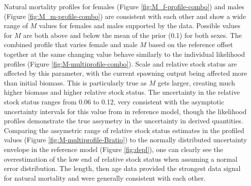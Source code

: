 \documentclass[11pt,
  english,
  a4paper,
]{article}
\begin{document}
Natural mortality profiles for females (Figure \ref{fig:M_f-profile-combo}) and males (Figure \ref{fig:M_m-profile-combo}) are consistent with each other and show a wide range of {\(M\)\leavevmode\tagmcend\tagstructend} values for females and males supported by the data. Possible values for {\(M\)\leavevmode\tagmcend\tagstructend} are both above and below the mean of the prior (0.1) for both sexes. The combined profile that varies female and male {\(M\)\leavevmode\tagmcend\tagstructend} based on the reference offset together at the same changing value behave similarly to the individual likelihood profiles (Figure \ref{fig:M-multiprofile-combo}). Scale and relative stock status are affected by this parameter, with the current spawning output being affected more than initial biomass. This is particularly true as {\(M\)\leavevmode\tagmcend\tagstructend} gets larger, creating much higher biomass and higher relative stock status. The uncertainty in the relative stock status ranges from 0.06 to 0.12, very consistent with the asymptotic uncertainty intervals for this value from in reference model, though the likelihood profiles demonstrate the true assymetry in the uncertainty in derived quantities. Comparing the assymetric range of relative stock status estimates in the profiled values (Figure \ref{fig:M-multiprofile-Bratio}) to the normally distributed uncertainty envelope in the reference model (Figure \ref{fig:depl}), one can clearly see the overestimation of the low end of relative stock status when assuming a normal error distribution. The length, then age data provided the strongest data signal for natural mortality and were generally consistent with each other.

\leavevmode\tagmcend\tagstructend\par

\end{document}
